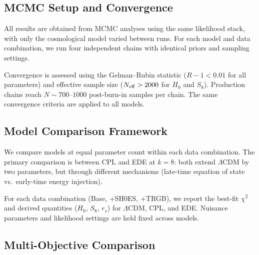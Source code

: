 \documentclass[a4paper,11pt]{article}
\begin{document}

\subsection{MCMC Setup and Convergence}
\label{sec:mcmc}

All results are obtained from MCMC analyses using the same likelihood stack, with only the cosmological model varied between runs. For each model and data combination, we run four independent chains with identical priors and sampling settings.

Convergence is assessed using the Gelman--Rubin statistic ($R - 1 < 0.01$ for all parameters) and effective sample size ($N_{\rm eff} > 2000$ for $H_0$ and $S_8$). Production chains reach $N \sim 700$--$1000$ post-burn-in samples per chain. The same convergence criteria are applied to all models.


\subsection{Model Comparison Framework}
\label{sec:equal_k}

We compare models at equal parameter count within each data combination. The primary comparison is between CPL and EDE at $k = 8$: both extend $\Lambda$CDM by two parameters, but through different mechanisms (late-time equation of state vs.\ early-time energy injection).

For each data combination (Base, +SH0ES, +TRGB), we report the best-fit $\chi^2$ and derived quantities ($H_0$, $S_8$, $r_s$) for $\Lambda$CDM, CPL, and EDE. Nuisance parameters and likelihood settings are held fixed across models.


\subsection{Multi-Objective Comparison}
\label{sec:pareto}
\end{document}

